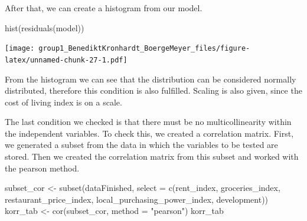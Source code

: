 \documentclass[
  11pt,
  a4paper,
  twoside]{scrbook}
\newenvironment{Shaded}{\begin{snugshade}}{\end{snugshade}}
\newcommand{\AttributeTok}[1]{\textcolor[rgb]{0.77,0.63,0.00}{#1}}
\newcommand{\FunctionTok}[1]{\textcolor[rgb]{0.00,0.00,0.00}{#1}}
\newcommand{\NormalTok}[1]{#1}
\newcommand{\OtherTok}[1]{\textcolor[rgb]{0.56,0.35,0.01}{#1}}
\newcommand{\StringTok}[1]{\textcolor[rgb]{0.31,0.60,0.02}{#1}}
\begin{document}
\linespread{1}

After that, we can create a histogram from our model.

\linespread{1}

\begin{Shaded}
\begin{Highlighting}[]
\FunctionTok{hist}\NormalTok{(}\FunctionTok{residuals}\NormalTok{(model))}
\end{Highlighting}
\end{Shaded}

\linespread{1}\texttt{[image: group1\_BenediktKronhardt\_BoergeMeyer\_files/figure-latex/unnamed-chunk-27-1.pdf]}

From the histogram we can see that the distribution can be considered normally distributed, therefore this condition is also fulfilled.
Scaling is also given, since the cost of living index is on a scale.

The last condition we checked is that there must be no multicollinearity within the independent variables.
To check this, we created a correlation matrix. First, we generated a subset from the data in which the variables to be tested are stored. Then we created the correlation matrix from this subset and worked with the pearson method.

\linespread{1}

\begin{Shaded}
\begin{Highlighting}[]
\NormalTok{subset\_cor }\OtherTok{\textless{}{-}} \FunctionTok{subset}\NormalTok{(dataFinished, }\AttributeTok{select =} \FunctionTok{c}\NormalTok{(rent\_index, groceries\_index, restaurant\_price\_index, local\_purchasing\_power\_index, development))}
\NormalTok{korr\_tab }\OtherTok{\textless{}{-}} \FunctionTok{cor}\NormalTok{(subset\_cor, }\AttributeTok{method =} \StringTok{"pearson"}\NormalTok{)}
\NormalTok{korr\_tab}
\end{Highlighting}
\end{Shaded}

\linespread{1}
\end{document}
